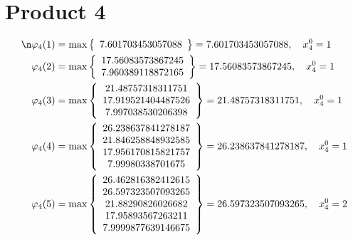 \documentclass{article}
\begin{document}
\section{Product 4}
\begin{align*}
\n  
  
\varphi_{4}(1) &= \max \left\{ \begin{array}{c}
7.601703453057088
\end{array} \right\} = 7.601703453057088, \quad x_{4}^0 = 1\\
  
  
  
  
\varphi_{4}(2) &= \max \left\{ \begin{array}{c}
17.56083573867245 \\
 7.960389118872165
\end{array} \right\} = 17.56083573867245, \quad x_{4}^0 = 1\\
  
  
  
  
\varphi_{4}(3) &= \max \left\{ \begin{array}{c}
21.48757318311751 \\
 17.919521404487526 \\
 7.997038530206398
\end{array} \right\} = 21.48757318311751, \quad x_{4}^0 = 1\\
  
  
  
  
\varphi_{4}(4) &= \max \left\{ \begin{array}{c}
26.238637841278187 \\
 21.846258848932585 \\
 17.956170815821757 \\
 7.99980338701675
\end{array} \right\} = 26.238637841278187, \quad x_{4}^0 = 1\\
  
  
  
  
\varphi_{4}(5) &= \max \left\{ \begin{array}{c}
26.462816382412615 \\
 26.597323507093265 \\
 21.88290826026682 \\
 17.95893567263211 \\
 7.9999877639146675
\end{array} \right\} = 26.597323507093265, \quad x_{4}^0 = 2\\
  
  
  

\end{align*}
\end{document}
